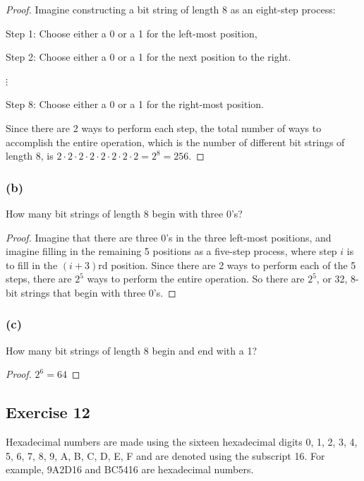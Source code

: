 \documentclass[14pt]{extarticle}
\newcommand{\cy}{\color{cyan}}
\begin{document}
\begin{proof}
     Imagine constructing a bit string of length 8 as an eight-step process:

     {\cy Step 1:} Choose either a 0 or a 1 for the left-most position,

     {\cy Step 2:} Choose either a 0 or a 1 for the next position to the right.

     \(\vdots\)

     {\cy Step 8:} Choose either a 0 or a 1 for the right-most position.

     Since there are 2 ways to perform each step, the total number of ways to accomplish the entire operation, which is
     the number of different bit strings of length 8, is \(2 \cdot 2 \cdot 2 \cdot 2 \cdot 2 \cdot 2 \cdot 2 \cdot 2 =
     2^8 = 256\).
\end{proof}

\subsubsection{(b)}
How many bit strings of length 8 begin with three 0’s?

\begin{proof}
     Imagine that there are three 0’s in the three left-most positions, and imagine filling in the remaining 5 positions
     as a five-step process, where step $i$ is to fill in the \((i + 3)\)rd position. Since there are 2 ways to perform
     each of the 5 steps, there are \(2^5\) ways to perform the entire operation. So there are \(2^5\), or 32, 8-bit
     strings that begin with three 0’s.
\end{proof}

\subsubsection{(c)}
How many bit strings of length 8 begin and end with a 1?

\begin{proof}
     \(2^6 = 64\)
\end{proof}

\subsection{Exercise 12}
Hexadecimal numbers are made using the sixteen hexadecimal digits 0, 1, 2, 3, 4, 5, 6, 7, 8, 9, A, B, C, D, E, F and
are denoted using the subscript 16. For example, 9A2D16 and BC5416 are hexadecimal numbers.
\end{document}

